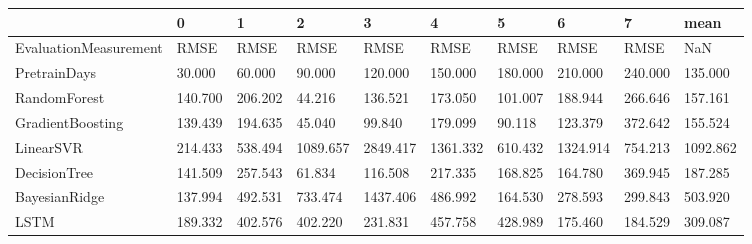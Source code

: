 \begin{tabular}{llllllllll}
\toprule
{} &       0 &       1 &        2 &        3 &        4 &       5 &        6 &       7 &     mean \\
\midrule
EvaluationMeasurement &    RMSE &    RMSE &     RMSE &     RMSE &     RMSE &    RMSE &     RMSE &    RMSE &      NaN \\
PretrainDays          &  30.000 &  60.000 &   90.000 &  120.000 &  150.000 & 180.000 &  210.000 & 240.000 &  135.000 \\
RandomForest          & 140.700 & 206.202 &   44.216 &  136.521 &  173.050 & 101.007 &  188.944 & 266.646 &  157.161 \\
GradientBoosting      & 139.439 & 194.635 &   45.040 &   99.840 &  179.099 &  90.118 &  123.379 & 372.642 &  155.524 \\
LinearSVR             & 214.433 & 538.494 & 1089.657 & 2849.417 & 1361.332 & 610.432 & 1324.914 & 754.213 & 1092.862 \\
DecisionTree          & 141.509 & 257.543 &   61.834 &  116.508 &  217.335 & 168.825 &  164.780 & 369.945 &  187.285 \\
BayesianRidge         & 137.994 & 492.531 &  733.474 & 1437.406 &  486.992 & 164.530 &  278.593 & 299.843 &  503.920 \\
LSTM                  & 189.332 & 402.576 &  402.220 &  231.831 &  457.758 & 428.989 &  175.460 & 184.529 &  309.087 \\
\bottomrule
\end{tabular}
